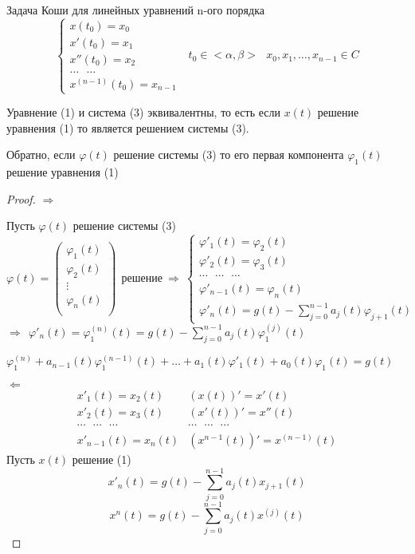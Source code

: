 \begin{define}
  Задача Коши для линейных уравнений n-ого порядка
  $$
  \left\{
  \begin{array}{l}
    x(t_0) = x_0 \\
    x'(t_0) = x_1 \\
    x''(t_0) = x_2 \\
    \ldots ~~~ \ldots \\
    x^{(n-1)}(t_0) = x_{n-1}
  \end{array}
  \right.
  ~~~
  t_0 \in <\alpha, \beta>
  ~~~
  x_0, x_1, \ldots, x_{n-1} \in C
  $$
\end{define}

\begin{block}[Утверждение]
  Уравнение (1) и система (3) эквивалентны, то есть если $x(t)$ решение
  уравнения (1) то является решением системы (3).

  Обратно, если $\varphi(t)$ решение системы (3) то его первая компонента
  $\varphi_1(t)$ решение уравнения (1)
\end{block}

\begin{proof}
  $\Rightarrow$

  Пусть $\varphi(t)$ решение системы (3)
  $$
  \varphi(t) =
  \left(
  \begin{array}{c}
    \varphi_1(t) \\
    \varphi_2(t) \\
    \vdots \\
    \varphi_n(t) \\
  \end{array}
  \right)
  ~~
  \text{решение}
  ~
  \Rightarrow
  ~
  \left\{
  \begin{array}{l}
    \varphi'_1(t) = \varphi_2(t) \\
    \varphi'_2(t) = \varphi_3(t) \\
    \cdots ~~~ \cdots ~~~ \cdots \\
    \varphi'_{n-1}(t) = \varphi_n(t) \\
    \varphi'_n(t) = g(t) - \sum_{j=0}^{n-1} a_j(t) \varphi_{j+1}(t)
  \end{array}
  \right.
  $$
  $\Rightarrow ~~ \varphi'_n(t) = \varphi_1^{(n)}(t) =
    g(t) - \sum_{j=0}^{n-1} a_j(t) \varphi_1^{(j)}(t)$

  $\varphi_1^{(n)} + a_{n-1}(t) \varphi_1^{(n-1)}(t) + \ldots +
  a_1(t)\varphi'_1(t) + a_0(t) \varphi_1(t) = g(t)$

  $\Leftarrow$
  $$
  \begin{array}{ll}
    x'_1(t) = x_2(t) & (x(t))' = x'(t) \\
    x'_2(t) = x_3(t) & (x'(t))' = x''(t) \\
    \cdots ~~~ \cdots ~~~ \cdots &
    \cdots ~~~ \cdots ~~~ \cdots \\
    x'_{n-1}(t) = x_n(t) & (x^{n-1}(t))' = x^{(n-1)}(t)
  \end{array}
  $$
  Пусть $x(t)$ решение (1)
  $$
  x'_n(t) = g(t) - \sum_{j=0}^{n-1} a_j(t) x_{j+1}(t)
  $$
  $$
  x^n(t) = g(t) - \sum_{j=0}^{n-1} a_j(t) x^{(j)}(t)
  $$
\end{proof}

